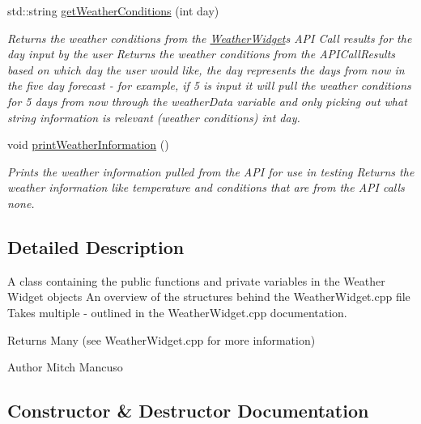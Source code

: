\begin{DoxyCompactItemize}
std\+::string \mbox{\hyperlink{class_weather_widget_a2d1c33c6a51b5f2bf28cbcb6487007c8}{get\+Weather\+Conditions}} (int day)
\begin{DoxyCompactList}\small\item\em Returns the weather conditions from the \mbox{\hyperlink{class_weather_widget}{Weather\+Widget}}\textquotesingle{}s A\+PI Call results for the day input by the user  Returns the weather conditions from the A\+P\+I\+Call\+Results based on which day the user would like, the day represents the days from now in the five day forecast -\/ for example, if 5 is input it will pull the weather conditions for 5 days from now through the weather\+Data variable and only picking out what string information is relevant (weather conditions)  int day. \end{DoxyCompactList}\item 
void \mbox{\hyperlink{class_weather_widget_acf4d5ed2d0e64b6a05351883e605ec23}{print\+Weather\+Information}} ()
\begin{DoxyCompactList}\small\item\em Prints the weather information pulled from the A\+PI for use in testing  Returns the weather information like temperature and conditions that are from the A\+PI calls  none. \end{DoxyCompactList}\end{DoxyCompactItemize}


\subsection{Detailed Description}
A class containing the public functions and private variables in the Weather Widget objects  An overview of the structures behind the Weather\+Widget.\+cpp file  Takes multiple -\/ outlined in the Weather\+Widget.\+cpp documentation. 

\begin{DoxyReturn}{Returns}
Many (see Weather\+Widget.\+cpp for more information) 
\end{DoxyReturn}
\begin{DoxyAuthor}{Author}
Mitch Mancuso 
\end{DoxyAuthor}


\subsection{Constructor \& Destructor Documentation}
\mbox{\label{class_weather_widget_a671797f620c32b858c7746e4f8dd3a82}} 
